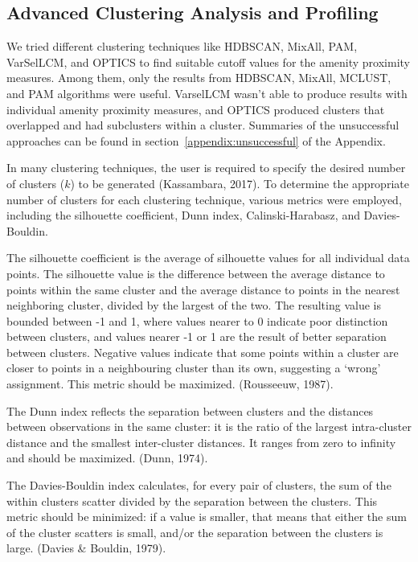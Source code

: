 \documentclass[11pt, a4paper]{article}
\begin{document}
\subsection{Advanced Clustering Analysis and Profiling}


We tried different clustering techniques like HDBSCAN, MixAll, PAM, VarSelLCM, and OPTICS to find suitable cutoff values for the amenity proximity measures. Among them, only the results from HDBSCAN, MixAll, MCLUST, and PAM algorithms were useful. VarselLCM wasn't able to produce results with individual amenity proximity measures, and OPTICS produced clusters that overlapped and had subclusters within a cluster. Summaries of the unsuccessful approaches can be found in section~\ref{appendix:unsuccessful} of the Appendix.
\par
In many clustering techniques, the user is required to specify the desired number of clusters ($k$) to be generated (Kassambara, 2017). To determine the appropriate number of clusters for each clustering technique, various metrics were employed, including the silhouette coefficient, Dunn index, Calinski-Harabasz, and Davies-Bouldin. %
\par
The silhouette coefficient is the average of silhouette values for all individual data points. The silhouette value is the difference between the average distance to points within the same cluster and the average distance to points in the nearest neighboring cluster, divided by the largest of the two. The resulting value is bounded between -1 and 1, where values nearer to 0 indicate poor distinction between clusters, and values nearer -1 or 1 are the result of better separation between clusters. Negative values indicate that some points within a cluster are closer to points in a neighbouring cluster than its own, suggesting a `wrong' assignment. This metric should be maximized. (Rousseeuw, 1987).
\par
The Dunn index reflects the separation between clusters and the distances between observations in the same cluster: it is the ratio of the largest intra-cluster distance and the smallest inter-cluster distances. It ranges from zero to infinity and should be maximized. (Dunn, 1974).
\par
The Davies-Bouldin index calculates, for every pair of clusters, the sum of the within clusters scatter divided by the separation between the clusters. This metric should be minimized: if a value is smaller, that means that either the sum of the cluster scatters is small, and/or the separation between the clusters is large. (Davies \& Bouldin, 1979).
\end{document}
